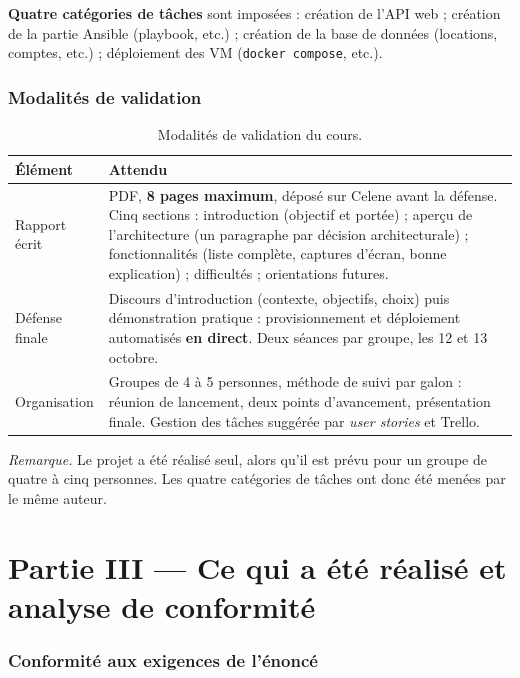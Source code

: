 \documentclass[11pt,a4paper]{article}
\begin{document}
\textbf{Quatre catégories de tâches} sont imposées : création de l'API web ; création de la partie Ansible
(playbook, etc.) ; création de la base de données (locations, comptes, etc.) ; déploiement des VM
(\texttt{docker compose}, etc.).

\section{Modalités de validation}

\begin{table}[h]\centering\small
\begin{tabular}{@{}p{3.2cm}p{11.5cm}@{}}
\toprule
\textbf{Élément} & \textbf{Attendu}\\
\midrule
Rapport écrit & PDF, \textbf{8 pages maximum}, déposé sur Celene avant la défense. Cinq sections :
introduction (objectif et portée) ; aperçu de l'architecture (un paragraphe par décision
architecturale) ; fonctionnalités (liste complète, captures d'écran, bonne explication) ;
difficultés ; orientations futures.\\
\addlinespace
Défense finale & Discours d'introduction (contexte, objectifs, choix) puis démonstration pratique :
provisionnement et déploiement automatisés \textbf{en direct}. Deux séances par groupe, les 12 et 13 octobre.\\
\addlinespace
Organisation & Groupes de 4 à 5 personnes, méthode de suivi par galon : réunion de lancement, deux points
d'avancement, présentation finale. Gestion des tâches suggérée par \emph{user stories} et Trello.\\
\bottomrule
\end{tabular}
\caption{Modalités de validation du cours.}
\end{table}

\textit{Remarque.} Le projet a été réalisé seul, alors qu'il est prévu pour un groupe de quatre à cinq
personnes. Les quatre catégories de tâches ont donc été menées par le même auteur.

\clearpage
\part*{Partie III --- Ce qui a été réalisé et analyse de conformité}

\section{Conformité aux exigences de l'énoncé}
\end{document}
